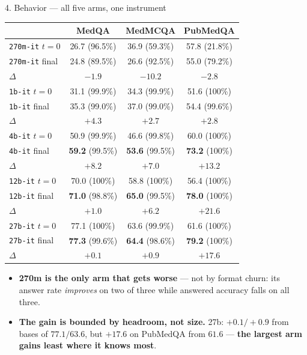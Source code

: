 \documentclass[aspectratio=169,10pt]{beamer}
\newcommand{\good}[1]{\textcolor{up}{#1}}
\newcommand{\bad}[1]{\textcolor{down}{#1}}
\begin{document}
\begin{frame}{4. Behavior --- all five arms, one instrument}
  \vspace{0.3em}
  \centering
  {\scriptsize
  \begin{tabular}{lccc}
    \toprule
    & MedQA & MedMCQA & PubMedQA \\
    \midrule
    \texttt{270m-it} $t{=}0$  & 26.7 \; (96.5\%) & 36.9 \; (\bad{59.3\%}) & 57.8 \; (\bad{21.8\%}) \\
    \texttt{270m-it} final    & 24.8 \; (89.5\%) & 26.6 \; (92.5\%) & 55.0 \; (79.2\%) \\
    \quad $\Delta$            & \bad{$-1.9$} & \bad{$-10.2$} & \bad{$-2.8$} \\
    \addlinespace
    \texttt{1b-it} $t{=}0$    & 31.1 \; (99.9\%) & 34.3 \; (99.9\%) & 51.6 \; (100\%) \\
    \texttt{1b-it} final      & 35.3 \; (99.0\%) & 37.0 \; (99.0\%) & 54.4 \; (99.6\%) \\
    \quad $\Delta$            & \good{$+4.3$} & \good{$+2.7$} & \good{$+2.8$} \\
    \addlinespace
    \texttt{4b-it} $t{=}0$    & 50.9 \; (99.9\%) & 46.6 \; (99.8\%) & 60.0 \; (100\%) \\
    \texttt{4b-it} final      & \good{\textbf{59.2}} \; (99.5\%) & \good{\textbf{53.6}} \; (99.5\%) & \good{\textbf{73.2}} \; (100\%) \\
    \quad $\Delta$            & \good{$+8.2$} & \good{$+7.0$} & \good{$+13.2$} \\
    \addlinespace
    \texttt{12b-it} $t{=}0$   & 70.0 \; (100\%) & 58.8 \; (100\%) & 56.4 \; (100\%) \\
    \texttt{12b-it} final     & \good{\textbf{71.0}} \; (98.8\%) & \good{\textbf{65.0}} \; (99.5\%) & \good{\textbf{78.0}} \; (100\%) \\
    \quad $\Delta$            & \good{$+1.0$} & \good{$+6.2$} & \good{$+21.6$} \\
    \addlinespace
    \texttt{27b-it} $t{=}0$   & 77.1 \; (100\%) & 63.6 \; (99.9\%) & 61.6 \; (100\%) \\
    \texttt{27b-it} final     & \good{\textbf{77.3}} \; (99.6\%) & \good{\textbf{64.4}} \; (98.6\%) & \good{\textbf{79.2}} \; (100\%) \\
    \quad $\Delta$            & \good{$+0.1$} & \good{$+0.9$} & \good{$+17.6$} \\
    \bottomrule
  \end{tabular}}

  \vspace{0.4em}
  {\footnotesize
  \begin{itemize}\setlength{\itemsep}{0.1em}
    \item \bad{\textbf{270m is the only arm that gets worse}} --- not by format
      churn: its answer rate \emph{improves} on two of three while answered
      accuracy falls on all three.
    \item \textbf{The gain is bounded by headroom, not size.} \good{27b:}
      $+0.1 / +0.9$ from bases of $77.1 / 63.6$, but $+17.6$ on PubMedQA from
      $61.6$ --- \textbf{the largest arm gains least where it knows most}.
  \end{itemize}}
\end{frame}
\end{document}
